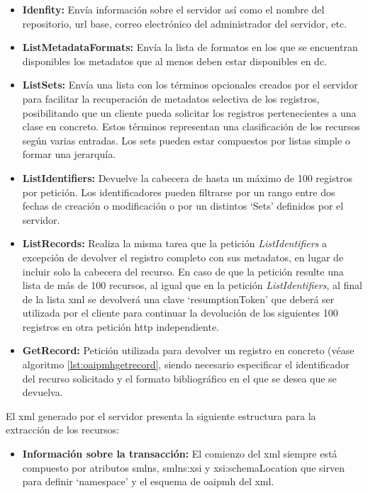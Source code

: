 \begin{itemize}
	\item \textbf{Idenfity:} Envía información sobre el servidor así como el nombre del repositorio, \acrshort{url} base, correo electrónico del administrador del servidor, etc.
	\item \textbf{ListMetadataFormats:} Envía la lista de formatos en los que se encuentran disponibles los metadatos que al menos deben estar disponibles en \acrshort{dc}.
	\item \textbf{ListSets:} Envía una lista con los términos opcionales creados por el servidor para facilitar la recuperación de metadatos selectiva de los registros, posibilitando que un cliente pueda solicitar los registros pertenecientes a una clase en concreto. Estos términos representan una clasificación de los recursos según varias entradas. Los sets pueden estar compuestos por listas simple o formar una jerarquía.
	\item \textbf{ListIdentifiers: } Devuelve la cabecera de hasta un máximo de 100 registros por petición. Los identificadores pueden filtrarse por un rango entre dos fechas de creación o modificación o por un distintos `Sets' definidos por el servidor.
	\item \textbf{ListRecords: } Realiza la misma tarea que la petición \textit{ListIdentifiers} a excepción de devolver el registro completo con sus metadatos, en lugar de incluir solo la cabecera del recurso. En caso de que la petición resulte una lista de más de 100 recursos, al igual que en la petición \textit{ListIdentifiers}, al final de la lista \acrshort{xml} se devolverá una clave `resumptionToken' que deberá ser utilizada por el cliente para continuar la devolución de los siguientes 100 registros en otra petición \acrshort{http} independiente.
	\item \textbf{GetRecord: } Petición utilizada para devolver un registro en concreto (véase algoritmo \ref{lst:oaipmhgetrecord}, siendo necesario especificar el identificador del recurso solicitado y el formato bibliográfico en el que se desea que se devuelva.
\end{itemize}



El \acrshort{xml} generado por el servidor presenta la siguiente estructura para la extracción de los recursos:

\begin{itemize}
	\item \textbf{Información sobre la transacción:} El comienzo del \acrshort{xml} siempre está compuesto por atributos smlns, smlns:xsi y xsi:schemaLocation que sirven para definir `namespace' y el esquema de \acrshort{oaipmh} del \acrshort{xml}.

\end{itemize}
